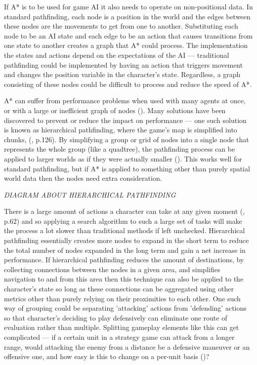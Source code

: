 \documentclass[11pt, a4paper]{article}
\begin{document}
If A* is to be used for game AI it also needs to operate on non-positional data. In standard pathfinding, each node is a position in the world and the edges between these nodes are the movements to get from one to another. Substituting each node to be an AI state and each edge to be an action that causes transitions from one state to another creates a graph that A* could process. The implementation the states and actions depend on the expectations of the AI --- traditional pathfinding could be implemented by having an action that triggers movement and changes the position variable in the character's state. Regardless, a graph consisting of these nodes could be difficult to process and reduce the speed of A*.

A* can suffer from performance problems when used with many agents at once, or with a large or inefficient graph of nodes (\cite{graham2003pathfinding}). Many solutions have been discovered to prevent or reduce the impact on performance --- one such solution is known as hierarchical pathfinding, where the game's map is simplified into chunks, (\cite{cui2011based}, p.126). By simplifying a group or grid of nodes into a single node that represents the whole group (like a quadtree), the pathfinding process can be applied to larger worlds as if they were actually smaller (\cite{botea2004near}). This works well for standard pathfinding, but if A* is applied to something other than purely spatial world data then the nodes need extra consideration. 

\emph{DIAGRAM ABOUT HIERARCHICAL PATHFINDING}

There is a large amount of actions a character can take at any given moment (\cite{nareyek2004ai}, p.62) and so applying a search algorithm to such a large set of tasks will make the process a lot slower than traditional methods if left unchecked. Hierarchical pathfinding essentially creates more nodes to expand in the short term to reduce the total number of nodes expanded in the long term and gain a net increase in performance. If hierarchical pathfinding reduces the amount of destinations, by collecting connections between the nodes in a given area, and simplifies navigation to and from this area then this technique can also be applied to the character's state so long as these connections can be aggregated using other metrics other than purely relying on their proximities to each other. One such way of grouping  could be separating 'attacking' actions from 'defending' actions so that character's deciding to play defensively can eliminate one route of evaluation rather than multiple. Splitting gameplay elements like this can get complicated --- if a certain unit in a strategy game can attack from a longer range, would attacking the enemy from a distance be a defensive maneuver or an offensive one, and how easy is this to change on a per-unit basis (\cite{weber2011building})?
\end{document}
